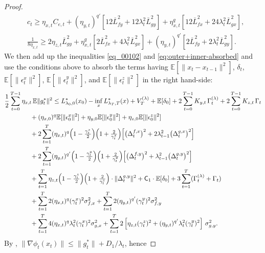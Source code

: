 \documentclass{uai2026} %
\newcommand{\EE}{\mathbb{E}}
\begin{document}
\begin{proof}
\begin{align}
    &c_{t}\ge \eta_{x,t}C_{e,t}+(\eta_{y,t})^{q'}[12\overline{L}_{fy}^{2}+12\lambda_{t}^{2}\overline{L}_{gy}^{2}]+\eta_{x,t}^{q}[12\overline{L}_{fx}^{2}+24\lambda_{t}^{2}\overline{L}_{gx}^{2}],\label{eq_cond_etas2}\\
    &\frac{1}{8\eta_{x,t}}\ge 2\eta_{z,t}\overline{L}_{gy}^{2}+\eta_{x,t}^{q}[2\overline{L}_{fx}^{2}+4\lambda_{t}^{2}\overline{L}_{gx}^{2}]+(\eta_{y,t})^{q'}[2\overline{L}_{fy}^{2}+2\lambda_{t}^{2}\overline{L}_{gy}^{2}].\label{eq_cond_etas3}
\end{align}
We then add up the inequalities \eqref{eq_00102} and \eqref{eq:outer+inner-absorbed} and use the conditions above to absorb the terms having $\mathbb{E}[\|x_{t}-x_{t-1}\|^{2}]$, $\delta_{t}$, $\mathbb{E}[\|\epsilon_{t}^{x}\|^{2}]$, $\mathbb{E}[\|\epsilon_{t}^{y}\|^{2}]$, and $\mathbb{E}[\|\epsilon_{t}^{z}\|^{2}]$ in the right hand-side:
\begin{align}
    \MoveEqLeft[4]\frac12\sum_{t=0}^{T-1} \eta_{x,t}\,\EE\|g_t^{*}\|^2
\le L^{*}_{\lambda_0,0}(x_0) - \inf_x L^{*}_{\lambda_T,T}(x) + V_T^{(\lambda)}+ \EE[\delta_0]
+ 2\sum_{t=0}^{T-1} K_{y,t}\,\Gamma_t^{(\lambda)} + 2\sum_{t=0}^{T-1} K_{z,t}\,\Gamma_t \notag\\
&+(\eta_{x,0})^{q}\mathbb{E}[\|\epsilon_{0}^{x}\|^{2}]+\eta_{y,0}\mathbb{E}[\|\epsilon_{0}^y\|^2]+\eta_{z,0}\mathbb{E}[\|\epsilon_{0}^z\|^2]\nonumber\\
 &
+ 2\sum_{t=1}^{T}(\eta_{x,t})^{q}\Big(1-\tfrac{\gamma_t^x}{2}\Big)\Big(1+\tfrac{2}{\gamma_t^x}\Big)\!\left[
\big(\Delta_t^{f,x}\big)^2+2\lambda_{t-1}^2\big(\Delta_t^{g,x}\big)^2\right]\notag\\
&+ 2\sum_{t=1}^{T}(\eta_{y,t})^{q'}\Big(1-\tfrac{\gamma_t^y}{2}\Big)\Big(1+\tfrac{2}{\gamma_t^y}\Big)\!\left[
\big(\Delta_t^{f,y}\big)^2+\lambda_{t-1}^2\big(\Delta_t^{g,y}\big)^2\right]\notag\\
&+ \sum_{t=1}^{T}\eta_{z,t}\Big(1-\tfrac{\gamma_t^z}{2}\Big)\Big(1+\tfrac{2}{\gamma_t^z}\Big)\cdot\|\Delta_{t}^{g,y}\|^{2}+\mathsf{C}_{1}\cdot \mathbb{E}[\delta_{0}]+3\sum_{t=1}^{T}(\Gamma_{t}^{(\lambda)}+\Gamma_{t})\nonumber\\
&+\sum_{t=1}^{T}2(\eta_{x,t})^{q}(\gamma_t^x)^2\sigma_{f,x}^2+\sum_{t=1}^{T}2(\eta_{y,t})^{q'}(\gamma_t^y)^2\sigma_{f,y}^2\nonumber\\
&+\sum_{t=1}^{T}4(\eta_{x,t})^{q}\lambda_t^2(\gamma_t^x)^2\sigma_{g,x}^2+ \sum_{t=1}^{T}2\left[\eta_{z,t}(\gamma_t^z)^2+(\eta_{y,t})^{q'}\lambda_t^2(\gamma_t^y)^2\right]\,\sigma_{g,y}^2.
\end{align}
By , $\|\nabla\phi_t(x_t)\|\le \|g_t^{*}\|+D_1/\lambda_t$, hence

\end{proof}
\end{document}

